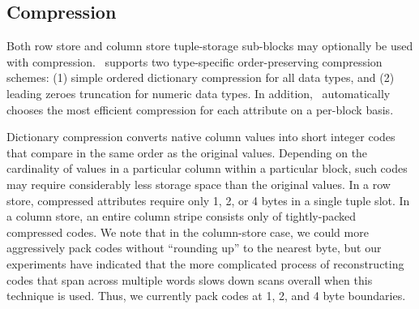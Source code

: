 \subsection{Compression} \label{sec-compression}
Both row store and column store tuple-storage sub-blocks may optionally be used with compression. \Quickstep\ supports two type-specific order-preserving compression schemes: (1) simple ordered dictionary compression for all data types, and (2) leading zeroes truncation for numeric data types. In addition, \Quickstep\ automatically chooses the most efficient compression for each attribute on a per-block basis.

Dictionary compression converts native column values into short integer codes that compare in the same order as the original values. Depending on the cardinality of values in a particular column within a particular block, such codes may require considerably less storage space than the original values. In a row store, compressed attributes require only 1, 2, or 4 bytes in a single tuple slot. In a column store, an entire column stripe consists only of tightly-packed compressed codes.  We note
that in the column-store case, we could more aggressively pack codes without ``rounding up'' to the nearest byte, but our experiments have indicated that the more complicated process of reconstructing codes that span across multiple words slows down scans overall when this technique is used. Thus, we currently pack codes at 1, 2, and 4 byte boundaries.




